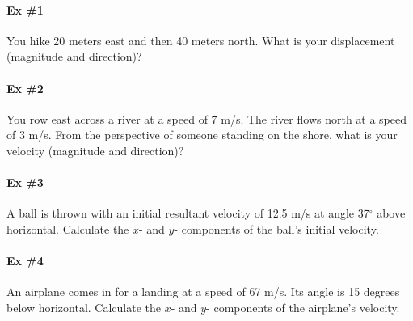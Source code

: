 \documentclass[11pt]{article}
\begin{document}
\pagestyle{empty}

\paragraph{Ex \#1} 

You hike 20 meters east and then 40 meters north.  What is your displacement (magnitude and direction)?

\pagebreak

\paragraph{Ex \#2} 

You row east across a river at a speed of 7 m/s.  The river flows north at a speed of 3 m/s.  From the perspective of someone standing on the shore, what is your velocity (magnitude and direction)?

\pagebreak

\paragraph{Ex \#3} 

A ball is thrown with an initial resultant velocity of 12.5 m/s at angle 37$^\circ$ above horizontal.  Calculate the $x$- and $y$- components of the ball's initial velocity.


\pagebreak

\paragraph{Ex \#4} 

An airplane comes in for a landing at a speed of 67 m/s.  Its angle is 15 degrees below horizontal.  Calculate the $x$- and $y$- components of the airplane's velocity.

\end{document}
